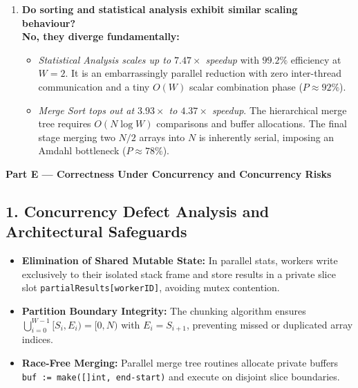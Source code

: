 \documentclass[11pt]{article}
\begin{document}
\begin{enumerate}[leftmargin=1.6em, itemsep=0.4em]
    \item \textbf{Do sorting and statistical analysis exhibit similar scaling behaviour?}\\
    \textbf{No, they diverge fundamentally:}
    \begin{itemize}
        \item \textit{Statistical Analysis scales up to $7.47\times$ speedup} with $99.2\%$ efficiency at $W = 2$. It is an embarrassingly parallel reduction with zero inter-thread communication and a tiny $O(W)$ scalar combination phase ($P \approx 92\%$).
        \item \textit{Merge Sort tops out at $3.93\times$ to $4.37\times$ speedup}. The hierarchical merge tree requires $O(N \log W)$ comparisons and buffer allocations. The final stage merging two $N/2$ arrays into $N$ is inherently serial, imposing an Amdahl bottleneck ($P \approx 78\%$).
    \end{itemize}
\end{enumerate}


\newpage
{\centering\fontsize{14}{17}\selectfont\textbf{Part E --- Correctness Under Concurrency and Concurrency Risks}\par}
\vspace{0.6em}

\subsection*{1. Concurrency Defect Analysis and Architectural Safeguards}
\begin{itemize}
    \item \textbf{Elimination of Shared Mutable State:} In parallel stats, workers write exclusively to their isolated stack frame and store results in a private slice slot \texttt{partialResults[workerID]}, avoiding mutex contention.
    \item \textbf{Partition Boundary Integrity:} The chunking algorithm ensures $\bigcup_{i=0}^{W-1} [S_i, E_i) = [0, N)$ with $E_i = S_{i+1}$, preventing missed or duplicated array indices.
    \item \textbf{Race-Free Merging:} Parallel merge tree routines allocate private buffers \texttt{buf := make([]int, end-start)} and execute on disjoint slice boundaries.
\end{itemize}
\end{document}
